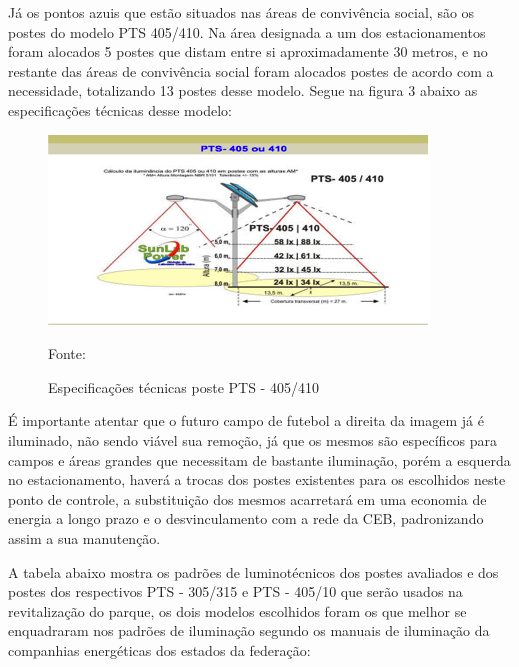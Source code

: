 J\'a os pontos azuis que est\~ao situados nas \'areas de conviv\^encia social, s\~ao os postes do modelo PTS 405/410. Na \'area designada a um dos estacionamentos foram alocados 5 postes que distam entre si aproximadamente 30 metros, e no restante das \'areas de conviv\^encia social foram alocados postes de acordo com a necessidade, totalizando 13 postes desse modelo. Segue na figura 3 abaixo as especifica\c{c}\~oes t\'ecnicas desse modelo:

\begin{figure}[H]
	 \centering
	\label{PTS405}
	 \includegraphics[keepaspectratio=true,scale=0.8]{figuras/PTS405.png}
	 \caption{Especifica\c{c}\~oes t\'ecnicas poste PTS - 405/410}
	 \small{Fonte: \cite{SUNLABPTS}}
\end{figure}

É importante atentar que o futuro campo de futebol a direita da imagem j\'a \'e iluminado, n\~ao sendo vi\'avel sua remo\c{c}\~ao, j\'a que os mesmos s\~ao espec\'ificos para campos e \'areas grandes que necessitam de bastante ilumina\c{c}\~ao, por\'em a esquerda no estacionamento, haver\'a a trocas dos postes existentes para os escolhidos neste ponto de controle, a substitui\c{c}\~ao dos mesmos acarretar\'a em uma economia de energia a longo prazo e o desvinculamento com a rede da CEB, padronizando assim a sua manuten\c{c}\~ao.

	A tabela abaixo mostra os padr\~oes de luminot\'ecnicos dos postes avaliados e dos postes dos respectivos PTS - 305/315 e PTS - 405/10 que ser\~ao usados na revitaliza\c{c}\~ao do parque, os dois modelos escolhidos foram os que melhor se enquadraram nos padr\~oes de ilumina\c{c}\~ao segundo os manuais de ilumina\c{c}\~ao da companhias energ\'eticas dos estados da federa\c{c}\~ao:

